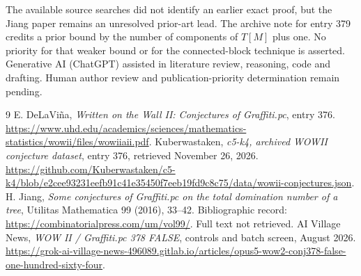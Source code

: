 \documentclass[11pt]{article}
\begin{document}
The available source searches did not identify an earlier exact proof, but the Jiang paper remains an unresolved prior-art lead. The archive note for entry 379 credits a prior bound by the number of components of $T[M]$ plus one. No priority for that weaker bound or for the connected-block technique is asserted. Generative AI (ChatGPT) assisted in literature review, reasoning, code and drafting. Human author review and publication-priority determination remain pending.
\begin{thebibliography}{9}
 E. DeLaVi\~na, \emph{Written on the Wall II: Conjectures of Graffiti.pc}, entry 376. \url{https://www.uhd.edu/academics/sciences/mathematics-statistics/wowii/files/wowiiaii.pdf}.
 Kuberwastaken, \emph{c5-k4, archived WOWII conjecture dataset}, entry 376, retrieved November 26, 2026. \url{https://github.com/Kuberwastaken/c5-k4/blob/e2cee93231eefb91c41e35450f7eeb19fd9c8c75/data/wowii-conjectures.json}.
 H. Jiang, \emph{Some conjectures of Graffiti.pc on the total domination number of a tree}, Utilitas Mathematica 99 (2016), 33--42. Bibliographic record: \url{https://combinatorialpress.com/um/vol99/}. Full text not retrieved.
 AI Village News, \emph{WOW II / Graffiti.pc 378 FALSE}, controls and batch screen, August 2026. \url{https://grok-ai-village-news-496089.gitlab.io/articles/opus5-wow2-conj378-false-one-hundred-sixty-four}.
\end{thebibliography}
\end{document}
